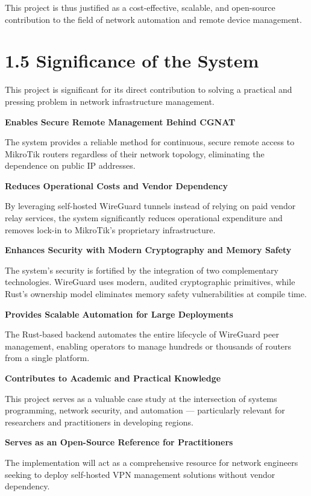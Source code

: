 \documentclass[12pt,a4paper,oneside]{report}
\begin{document}
This project is thus justified as a cost-effective, scalable, and open-source contribution to the field of network automation and remote device management.

\section{1.5 Significance of the System}

This project is significant for its direct contribution to solving a practical and pressing problem in network infrastructure management.

\textbf{Enables Secure Remote Management Behind CGNAT}

The system provides a reliable method for continuous, secure remote access to MikroTik routers regardless of their network topology, eliminating the dependence on public IP addresses.

\textbf{Reduces Operational Costs and Vendor Dependency}

By leveraging self-hosted WireGuard tunnels instead of relying on paid vendor relay services, the system significantly reduces operational expenditure and removes lock-in to MikroTik's proprietary infrastructure.

\textbf{Enhances Security with Modern Cryptography and Memory Safety}

The system's security is fortified by the integration of two complementary technologies. WireGuard uses modern, audited cryptographic primitives, while Rust's ownership model eliminates memory safety vulnerabilities at compile time.

\textbf{Provides Scalable Automation for Large Deployments}

The Rust-based backend automates the entire lifecycle of WireGuard peer management, enabling operators to manage hundreds or thousands of routers from a single platform.

\textbf{Contributes to Academic and Practical Knowledge}

This project serves as a valuable case study at the intersection of systems programming, network security, and automation --- particularly relevant for researchers and practitioners in developing regions.

\textbf{Serves as an Open-Source Reference for Practitioners}

The implementation will act as a comprehensive resource for network engineers seeking to deploy self-hosted VPN management solutions without vendor dependency.
\end{document}
